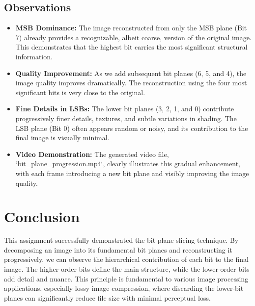 \documentclass{article}
\begin{document}
\clearpage
\subsection{Observations}
\begin{itemize}
    \item \textbf{MSB Dominance:} The image reconstructed from only the MSB plane (Bit 7) already provides a recognizable, albeit coarse, version of the original image. This demonstrates that the highest bit carries the most significant structural information.
    \item \textbf{Quality Improvement:} As we add subsequent bit planes (6, 5, and 4), the image quality improves dramatically. The reconstruction using the four most significant bits is very close to the original.
    \item \textbf{Fine Details in LSBs:} The lower bit planes (3, 2, 1, and 0) contribute progressively finer details, textures, and subtle variations in shading. The LSB plane (Bit 0) often appears random or noisy, and its contribution to the final image is visually minimal.
    \item \textbf{Video Demonstration:} The generated video file, `bit_plane_progression.mp4`, clearly illustrates this gradual enhancement, with each frame introducing a new bit plane and visibly improving the image quality.
\end{itemize}

\section{Conclusion}
This assignment successfully demonstrated the bit-plane slicing technique. By decomposing an image into its fundamental bit planes and reconstructing it progressively, we can observe the hierarchical contribution of each bit to the final image. The higher-order bits define the main structure, while the lower-order bits add detail and nuance. This principle is fundamental to various image processing applications, especially lossy image compression, where discarding the lower-bit planes can significantly reduce file size with minimal perceptual loss.
\end{document}
